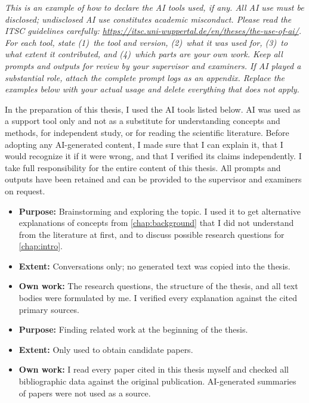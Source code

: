 \emph{This is an example of how to declare the AI tools used, if any. All AI use must be disclosed; undisclosed AI use constitutes academic misconduct. Please read the ITSC guidelines carefully: \url{https://itsc.uni-wuppertal.de/en/theses/the-use-of-ai/}. For each tool, state (1)~the tool and version, (2)~what it was used for, (3)~to what extent it contributed, and (4)~which parts are your own work. Keep all prompts and outputs for review by your supervisor and examiners. If AI played a substantial role, attach the complete prompt logs as an appendix. Replace the examples below with your actual usage and delete everything that does not apply.}

In the preparation of this thesis, I used the AI tools listed below.
AI was used as a support tool only and not as a substitute for understanding concepts and methods, for independent study, or for reading the scientific literature.
Before adopting any AI-generated content, I made sure that I can explain it, that I would recognize it if it were wrong, and that I verified its claims independently.
I take full responsibility for the entire content of this thesis.
All prompts and outputs have been retained and can be provided to the supervisor and examiners on request.

\begin{itemize}
    \item \textbf{Purpose:} Brainstorming and exploring the topic. I used it to get alternative explanations of concepts from \autoref{chap:background} that I did not understand from the literature at first, and to discuss possible research questions for \autoref{chap:intro}.
    \item \textbf{Extent:} Conversations only; no generated text was copied into the thesis.
    \item \textbf{Own work:} The research questions, the structure of the thesis, and all text bodies were formulated by me. I verified every explanation against the cited primary sources.
\end{itemize}

\begin{itemize}
    \item \textbf{Purpose:} Finding related work at the beginning of the thesis.
    \item \textbf{Extent:} Only used to obtain candidate papers.
    \item \textbf{Own work:} I read every paper cited in this thesis myself and checked all bibliographic data against the original publication. AI-generated summaries of papers were not used as a source.
\end{itemize}

